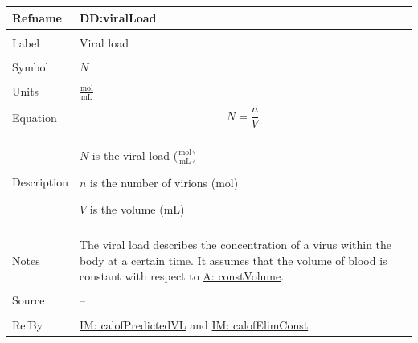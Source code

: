 \documentclass[12pt]{article}
\begin{document}
\vspace{\baselineskip}
\noindent
\begin{minipage}{\textwidth}
\begin{tabular}{>{\raggedright}p{}>{\raggedright\arraybackslash}p{}}
\toprule \textbf{Refname} & \textbf{DD:viralLoad}
\label{DD:viralLoad}
\\ \midrule \\
Label & Viral load
        
\\ \midrule \\
Symbol & $N$
         
\\ \midrule \\
Units & $\frac{\text{mol}}{\text{mL}}$
        
\\ \midrule \\
Equation & \begin{displaymath}
           N=\frac{n}{V}
           \end{displaymath}
\\ \midrule \\
Description & \begin{symbDescription}
              \item{$N$ is the viral load ($\frac{\text{mol}}{\text{mL}}$)}
              \item{$n$ is the number of virions (${\text{mol}}$)}
              \item{$V$ is the volume (${\text{mL}}$)}
              \end{symbDescription}
\\ \midrule \\
Notes & The viral load describes the concentration of  a virus within the body at a certain time. It assumes that the volume of blood is constant with respect to \hyperref[constVolume]{A: constVolume}.
        
\\ \midrule \\
Source & --
         
\\ \midrule \\
RefBy & \hyperref[IM:calofPredictedVL]{IM: calofPredictedVL} and \hyperref[IM:calofElimConst]{IM: calofElimConst}
        
\\ \bottomrule
\end{tabular}
\end{minipage}
\end{document}
